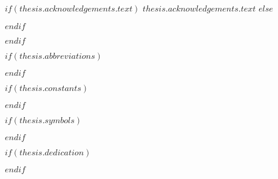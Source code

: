 \begin{acknowledgements}
\addchaptertocentry{\acknowledgementname} %
$if(thesis.acknowledgements.text)$
$thesis.acknowledgements.text$
$else$

$endif$
\end{acknowledgements}

$endif$


\begingroup
\hypersetup{linkcolor=$if(toclinkcolor)$$toclinkcolor$$else$black$endif$}

\renewcommand{\contentsname}{\'Indice}
\tableofcontents %

\renewcommand{\listfigurename}{Lista de Figuras}
\listoffigures %

\renewcommand{\listtablename}{Lista de Tablas}
\listoftables %

\endgroup


$if(thesis.abbreviations)$



$endif$

$if(thesis.constants)$



$endif$

$if(thesis.symbols)$



$endif$

$if(thesis.dedication)$

\dedicatory{} 

$endif$


\mainmatter %

\pagestyle{thesis} %
